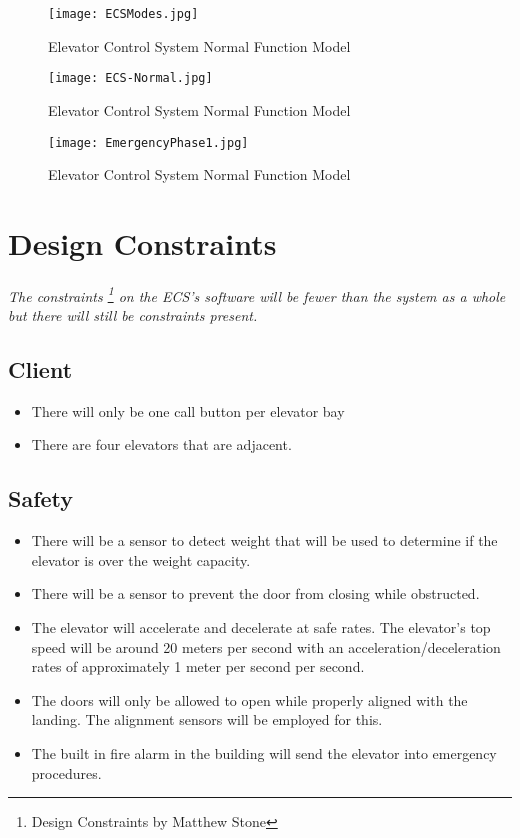 \documentclass[12pt]{article}
\begin{document}
		\begin{figure}[ht]
  			\centerline{\texttt{[image: ECSModes.jpg]}}
  			\caption{Elevator Control System Normal Function Model }
  			\label{fig:normal}
		\end{figure}

		\begin{figure}[ht]
  			\centerline{\texttt{[image: ECS-Normal.jpg]}}
  			\caption{Elevator Control System Normal Function Model }
  			\label{fig:normal}
		\end{figure}
	
		\begin{figure}[ht]
  			\centerline{\texttt{[image: EmergencyPhase1.jpg]}}
  			\caption{Elevator Control System Normal Function Model }
  			\label{fig:emerg}
		\end{figure}

\section{Design Constraints} \label{cons} %
	\paragraph{} \textit{The constraints \footnote{Design Constraints by Matthew Stone} on the ECS’s software will be fewer than the system 
	as a whole but there will still be constraints present.}

	\subsection{Client}
	\begin{itemize}
		\item There will only be one call button per elevator bay
		\item There are four elevators that are adjacent.
	\end{itemize}

	\subsection{Safety}
	\begin{itemize}
		\item There will be a sensor to detect weight that will be used to determine if the elevator is over the weight capacity.
		\item There will be a sensor to prevent the door from closing while obstructed. 
		\item The elevator will accelerate and decelerate at safe rates. The elevator’s top speed will be around 20 meters per second with an acceleration/deceleration rates of approximately 1 meter per second per second.
		\item The doors will only be allowed to open while properly aligned with the landing. The alignment sensors will be employed for this.
		\item The built in fire alarm in the building will send the elevator into emergency procedures.
	\end{itemize}
\end{document}
